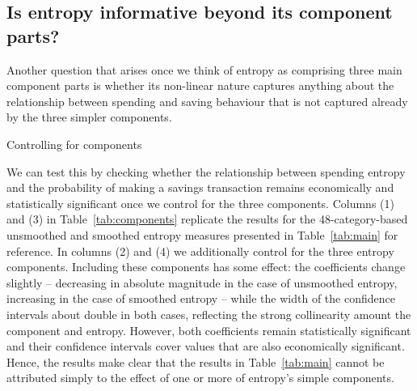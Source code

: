 \subsection{Is entropy informative beyond its component parts?}%
\label{sub:is_entropy_informative_beyond_its_component_parts_}

Another question that arises once we think of entropy as comprising three main
component parts is whether its non-linear nature captures anything about the
relationship between spending and saving behaviour that is not captured already
by the three simpler components. 

\begin{landscape}
\begin{table}[ht]
\centering\scriptsize
\caption{Controlling for components}
\label{tab:components}

\end{table}
\end{landscape}

We can test this by checking whether the relationship between spending entropy
and the probability of making a savings transaction remains economically and
statistically significant once we control for the three components. Columns (1)
and (3) in Table~\ref{tab:components} replicate the results for the 48-category-based
unsmoothed and smoothed entropy measures presented in Table~\ref{tab:main} for
reference. In columns (2) and (4) we additionally control for the three entropy
components. Including these components has some effect: the coefficients change
slightly -- decreasing in absolute magnitude in the case of unsmoothed entropy,
increasing in the case of smoothed entropy -- while the width of the confidence
intervals about double in both cases, reflecting the strong collinearity amount
the component and entropy. However, both coefficients remain statistically
significant and their confidence intervals cover values that are also
economically significant. Hence, the results make clear that the results in
Table~\ref{tab:main} cannot be attributed simply to the effect of one or more
of entropy's simple components.



